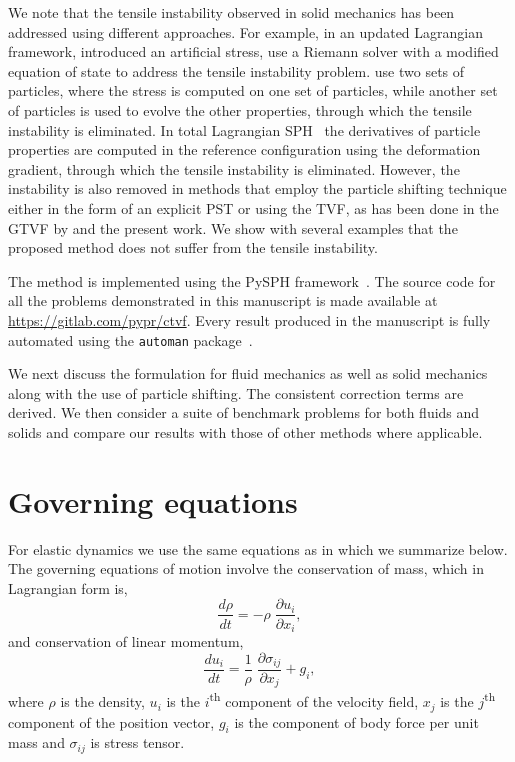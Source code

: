 \documentclass[preprint,12pt]{elsarticle}
\begin{document}
We note that the tensile instability observed in solid mechanics has been
addressed using different approaches. For example, in an updated Lagrangian
framework, \citet{gray-ed-2001} introduced an artificial stress,
\citet{sugiura2017extension} use a Riemann solver with a modified
equation of state to address the tensile instability problem.
\citet{dyka1995approach} use two sets of particles, where the stress is
computed on one set of particles, while another set of particles is used to
evolve the other properties, through which the tensile instability is
eliminated. In total Lagrangian SPH~\cite{belytschko2000unified} the
derivatives of particle properties are computed in the reference configuration
using the deformation gradient, through which the tensile instability is
eliminated. However, the instability is also removed in methods that employ
the particle shifting technique either in the form of an explicit PST or using
the TVF, as has been done in the GTVF by \citet{zhang_hu_adams17} and the
present work. We show with several examples that the proposed method does not
suffer from the tensile instability.

The method is implemented using the PySPH
framework~\cite{PR:pysph:scipy16,pysph2020}. The source code for all the
problems demonstrated in this manuscript is made available at
\url{https://gitlab.com/pypr/ctvf}. Every result produced in the manuscript is
fully automated using the \texttt{automan} package~\cite{pr:automan:2018}.

We next discuss the formulation for fluid mechanics as well as solid mechanics
along with the use of particle shifting. The consistent correction terms are
derived. We then consider a suite of benchmark problems for both fluids and
solids and compare our results with those of other methods where applicable.



\section{Governing equations}


For elastic dynamics we use the same equations as in
\cite{gray-ed-2001,zhang_hu_adams17} which we summarize below. The governing
equations of motion involve the conservation of mass, which in Lagrangian
form is,
\begin{equation}
  \label{eq:ce}
  \frac{d \rho}{d t} = - \rho \; \frac{\partial u_i}{\partial x_i},
\end{equation}
and conservation of linear momentum,
\begin{equation}
  \label{eq:me}
  \frac{d u_i}{d t} = \frac{1}{\rho} \; \frac{\partial \sigma_{ij}}{\partial x_j}
  + g_i,
\end{equation}
where $\rho$ is the density, $u_i$ is the $i$\textsuperscript{th} component of
the velocity field, $x_j$ is the $j$\textsuperscript{th} component of the
position vector, $g_i$ is the component of body force per unit mass and
$\sigma_{ij}$ is stress tensor.
\end{document}
